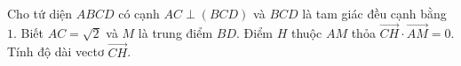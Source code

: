\begin{ex}
Cho tứ diện $ABCD$ có cạnh $AC\perp(BCD)$ và $BCD$ là tam giác đều cạnh bằng $1$. Biết $AC=\sqrt2$ và $M$ là trung điểm $BD$. Điểm $H$ thuộc $AM$ thỏa $\overrightarrow{CH}\cdot\overrightarrow{AM}=0$. Tính độ dài vectơ $\overrightarrow{CH}$.
\end{ex}

